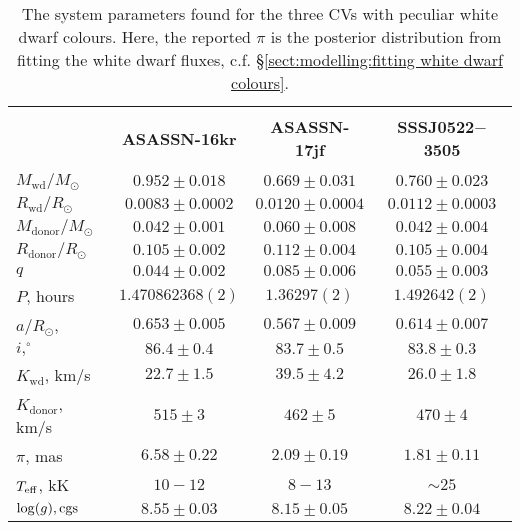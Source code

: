\begin{landscape}
    \begin{table*}
        \centering
        \caption{The system parameters found for the three CVs with peculiar white dwarf colours. Here, the reported $\pi$ is the posterior distribution from fitting the white dwarf fluxes, c.f. \S\ref{sect:modelling:fitting white dwarf colours}.}
        \label{appendix:table:three white dwarfs:system_parameters}
        \begin{tabular}{lccc}
            \hline \\
            ~                          & \textbf{ASASSN-16kr}    & \textbf{ASASSN-17jf}  & \textbf{SSSJ0522$-$3505} \\
            \hline \hline \\
            $M_\mathrm{wd}/M_\odot$    & $0.952\pm0.018$         & $0.669\pm0.031$        & $0.760\pm0.023$ \\
            $R_\mathrm{wd}/R_\odot$    & $0.0083\pm0.0002$       & $0.0120\pm0.0004$      & $0.0112\pm0.0003$ \\
            $M_\mathrm{donor}/M_\odot$ & $0.042\pm0.001$         & $0.060\pm0.008$        & $0.042\pm0.004$ \\
            $R_\mathrm{donor}/R_\odot$ & $0.105\pm0.002$         & $0.112\pm0.004$        & $0.105\pm0.004$ \\
            $q$                        & $0.044\pm0.002$         & $0.085\pm0.006$        & $0.055\pm0.003$ \\
            \hline
            $P$, hours                 & $1.470862368(2)$        & $1.36297(2)$           & $1.492642(2)$ \\
            $a/R_\odot$,               & $0.653\pm0.005$         & $0.567\pm0.009$        & $0.614\pm0.007$  \\
            $i, ^\circ$                & $86.4\pm0.4$            & $83.7\pm0.5$           & $83.8\pm0.3$  \\
            $K_\mathrm{wd}$, km/s      & $22.7\pm1.5$            & $39.5\pm4.2$           & $26.0\pm1.8$  \\
            $K_\mathrm{donor}$, km/s   & $515\pm3$               & $462\pm5$              & $470\pm4$  \\
            \hline
            $\pi$, mas                 & $6.58\pm0.22$           & $2.09\pm0.19$          & $1.81\pm0.11$  \\
            $T_{\rm eff}$, kK          & $10-12$                 & $8-13$                 & $\sim25$  \\
            $\log(g), {\rm cgs}$       & $8.55\pm0.03$           & $8.15\pm0.05$          & $8.22\pm0.04$  \\
            \hline
            \hline
        \end{tabular}
    \end{table*}



\end{landscape}
